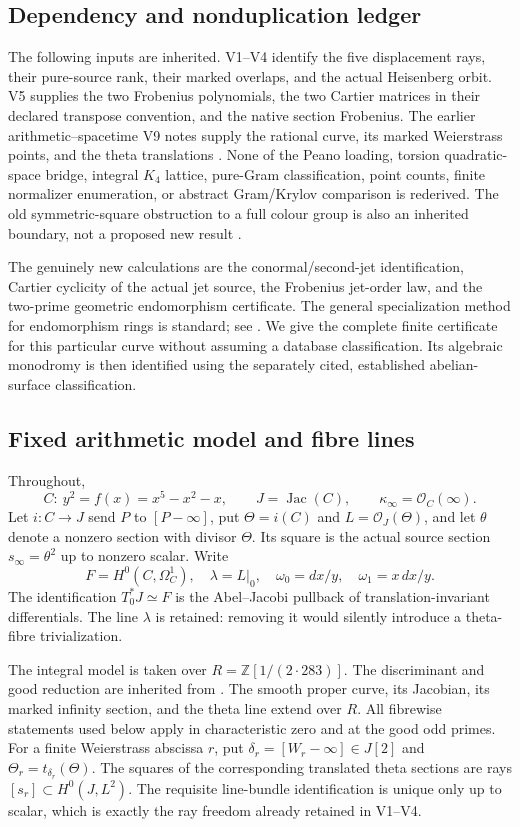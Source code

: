 \documentclass[11pt]{article}
\theoremstyle{definition}
\theoremstyle{remark}
\newcommand{\Z}{\mathbb Z}
\begin{document}
\subsection{Dependency and nonduplication ledger}
The following inputs are inherited. V1--V4 identify the five displacement
rays, their pure-source rank, their marked overlaps, and the actual
Heisenberg orbit. V5 supplies the two Frobenius polynomials, the two
Cartier matrices in their declared transpose convention, and the native
section Frobenius. The earlier arithmetic--spacetime V9 notes supply the
rational curve, its marked Weierstrass points, and the theta translations
\cite{AD9}. None of the Peano loading, torsion quadratic-space bridge,
integral $K_4$ lattice, pure-Gram classification, point counts, finite
normalizer enumeration, or abstract Gram/Krylov comparison is rederived.
The old symmetric-square obstruction to a full colour group is also an
inherited boundary, not a proposed new result \cite{AD9}.

The genuinely new calculations are the conormal/second-jet identification,
Cartier cyclicity of the actual jet source, the Frobenius jet-order law,
and the two-prime geometric endomorphism certificate. The general
specialization method for endomorphism rings is standard; see
\cite{LombardoEnd}. We give the complete finite certificate for this
particular curve without assuming a database classification. Its algebraic
monodromy is then identified using the separately cited, established
abelian-surface classification.

\subsection{Fixed arithmetic model and fibre lines}
Throughout,
\[
 C:\ y^2=f(x)=x^5-x^2-x,\qquad
 J=\operatorname{Jac}(C),\qquad
 \kappa_\infty=\mathcal O_C(\infty).
\]
Let $i:C\to J$ send $P$ to $[P-\infty]$, put
$\Theta=i(C)$ and $L=\mathcal O_J(\Theta)$, and let $\theta$ denote a
nonzero section with divisor $\Theta$. Its square is the actual source
section $s_\infty=\theta^2$ up to nonzero scalar. Write
\[
 F=H^0(C,\Omega_C^1),\quad \lambda=L|_0,\quad
 \omega_0=dx/y,\quad\omega_1=x\,dx/y.
\]
The identification $T_0^*J\simeq F$ is the Abel--Jacobi pullback of
translation-invariant differentials. The line $\lambda$ is retained:
removing it would silently introduce a theta-fibre trivialization.

The integral model is taken over
$R=\Z[1/(2\cdot283)]$. The discriminant and good reduction are inherited
from \cite{AD9}. The smooth proper curve, its Jacobian, its marked
infinity section, and the theta line extend over $R$. All fibrewise
statements used below apply in characteristic zero and at the good odd
primes. For a finite Weierstrass abscissa $r$, put
$\delta_r=[W_r-\infty]\in J[2]$ and
$\Theta_r=t_{\delta_r}(\Theta)$. The squares of the corresponding
translated theta sections are rays $[s_r]\subset H^0(J,L^2)$.
The requisite line-bundle identification is unique only up to scalar,
which is exactly the ray freedom already retained in V1--V4.
\end{document}
